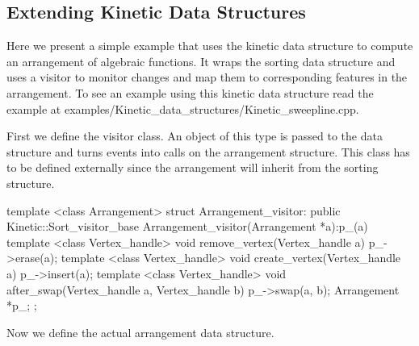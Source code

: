 

\subsection{Extending Kinetic Data Structures\label{sec:kds_sweepline_example}}


Here we present a simple example that uses the
 kinetic data structure to compute
an arrangement of algebraic functions. It wraps the sorting data
structure and uses a visitor to monitor changes and map them to
corresponding features in the arrangement. To see an example using
this kinetic data structure read the example at
examples/Kinetic\_data\_structures/Kinetic_sweepline.cpp.

First we define the visitor class. An object of this type is passed to
the  data structure and turns
events into calls on the arrangement structure. This class has to be
defined externally since the arrangement will inherit from the sorting
structure.

\begin{ccExampleCode}
template <class Arrangement>
struct Arrangement_visitor: public Kinetic::Sort_visitor_base
{
  Arrangement_visitor(Arrangement *a):p_(a){}
  template <class Vertex_handle>
  void remove_vertex(Vertex_handle a) {
    p_->erase(a);
  }
  template <class Vertex_handle>
  void create_vertex(Vertex_handle a) {
    p_->insert(a);
  }
  template <class Vertex_handle>
  void after_swap(Vertex_handle a, Vertex_handle b) {
    p_->swap(a, b);
  }
  Arrangement *p_;
};

\end{ccExampleCode}

Now we define the actual arrangement data structure. 

